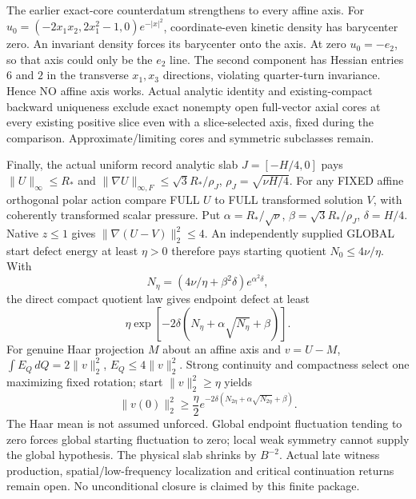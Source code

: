 \documentclass[11pt]{article}
\begin{document}
The earlier exact-core counterdatum strengthens to every affine axis.
For $u_0=(-2x_1x_2,2x_1^2-1,0)e^{-|x|^2}$, coordinate-even kinetic density
has barycenter zero. An invariant density forces its barycenter onto the
axis. At zero $u_0=-e_2$, so that axis could only be the $e_2$ line.
The second component has Hessian entries $6$ and $2$ in the transverse
$x_1,x_3$ directions, violating quarter-turn invariance. Hence NO affine
axis works. Actual analytic identity and existing-compact backward
uniqueness exclude exact nonempty open full-vector axial cores at every
existing positive slice even with a slice-selected axis, fixed during the
comparison. Approximate/limiting cores and symmetric subclasses remain.

Finally, the actual uniform record analytic slab $J=[-H/4,0]$ pays
$\|U\|_\infty\le R_*$ and
$\|\nabla U\|_{\infty,F}\le\sqrt3R_*/\rho_J$,
$\rho_J=\sqrt{\nu H/4}$.
For any FIXED affine orthogonal polar action compare FULL $U$ to FULL
transformed solution $V$, with coherently transformed scalar pressure.
Put $\alpha=R_*/\sqrt\nu$, $\beta=\sqrt3R_*/\rho_J$, $\delta=H/4$.
Native $z\le1$ gives $\|\nabla(U-V)\|_2^2\le4$.
An independently supplied GLOBAL start defect energy at least $\eta>0$
therefore pays starting quotient $N_0\le4\nu/\eta$. With
\[
 N_\eta=(4\nu/\eta+\beta^2\delta)e^{\alpha^2\delta},
\]
the direct compact quotient law gives endpoint defect at least
\[
 \eta\exp[-2\delta(N_\eta+\alpha\sqrt{N_\eta}+\beta)].
\]
For genuine Haar projection $M$ about an affine axis and $v=U-M$,
$\int E_Q\,dQ=2\|v\|_2^2$, $E_Q\le4\|v\|_2^2$.
Strong continuity and compactness select one maximizing fixed rotation;
start $\|v\|_2^2\ge\eta$ yields
\[
 \|v(0)\|_2^2\ge\frac\eta2
   e^{-2\delta(N_{2\eta}+\alpha\sqrt{N_{2\eta}}+\beta)}.
\]
The Haar mean is not assumed unforced. Global endpoint fluctuation tending
to zero forces global starting fluctuation to zero; local weak symmetry
cannot supply the global hypothesis. The physical slab shrinks by $B^{-2}$.
Actual late witness production, spatial/low-frequency localization and
critical continuation returns remain open. No unconditional closure is
claimed by this finite package.
\end{document}
